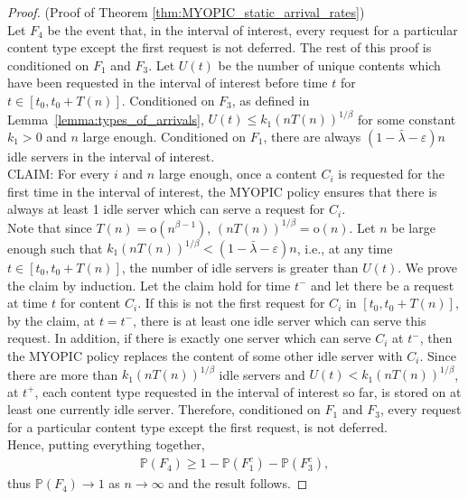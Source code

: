 \documentclass[10pt, conference, letterpaper]{IEEEtran}
\def \oo {\mathrm{o}}
\begin{document}
\begin{proof} (Proof of Theorem \ref{thm:MYOPIC_static_arrival_rates})\\
	Let $F_4$ be the event that, in the interval of interest, every request for a particular content type except the first request is not deferred.
	The rest of this proof is conditioned on $F_1$ and $F_3$. Let $U(t)$ be the number of unique contents which have been requested in the interval of interest before time $t$ for $t \in [t_0, t_0 + T(n) ]$. Conditioned on $F_3$, as defined in Lemma~\ref{lemma:types_of_arrivals}, $U(t) \leq k_1 (nT(n))^{1/\beta}$ for some constant $k_1>0$ and $n$ large enough. Conditioned on $F_1$, there are always $(1- \bar{\lambda} - \varepsilon) n$ idle servers in the interval of interest. \\
	\newline CLAIM: For every $i$ and $n$ large enough, once a content $C_i$ is requested for the first time in the interval of interest, the MYOPIC policy ensures that there is always at least 1 idle server which can serve a request for $C_i$.\\
	\newline Note that since $T(n) = \oo(n^{\beta-1})$, $(nT(n))^{1/\beta} = \oo(n)$. Let $n$ be large enough such that $k_1 (nT(n))^{1/\beta} < (1- \bar{\lambda} - \varepsilon) n$, i.e., at any time $t \in [t_0, t_0 + T(n)]$, the number of idle servers is greater than $ U(t)$. We prove the claim by induction. Let the claim hold for time $t^-$ and let there be a request at time $t$ for content $C_i$. If this is not the first request for $C_i$ in $[t_0, t_0 + T(n)]$, by the claim, at $t = t^-$, there is at least one idle server which can serve this request. In addition, if there is exactly one server which can serve $C_i$ at $t^-$, then the MYOPIC policy replaces the content of some other idle server with $C_i$. Since there are more than $k_1 (nT(n))^{1/\beta}$ idle servers and $U(t) < k_1 (nT(n))^{1/\beta}$, at $t^+$, each content type requested in the interval of interest so far, is stored on at least one currently idle server. Therefore, conditioned on $F_1$ and $F_3$, every request for a particular content type except the first request, is not deferred. \\
	\newline Hence, putting everything together,
	\begin{eqnarray*}
		\mathbb{P}(F_4) \geq 1 - \mathbb{P}(F_1^c) - \mathbb{P}(F_3^c),
	\end{eqnarray*}
	thus $\mathbb{P}(F_4) \rightarrow 1$ as $n \rightarrow \infty$ and the result follows.
\end{proof}
\end{document}
